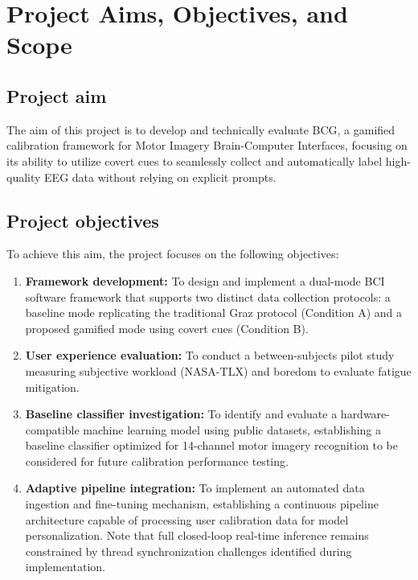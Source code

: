 \documentclass[a4paper, 11pt, openany]{report}
\begin{document}

\chapter{Project Aims, Objectives, and Scope}   

    \section{Project aim}    
    The aim of this project is to develop and technically evaluate BCG, a gamified calibration 
    framework for Motor Imagery Brain-Computer Interfaces, focusing on its ability to utilize 
    covert cues to seamlessly collect and automatically label high-quality EEG data without 
    relying on explicit prompts.

    \section{Project objectives}    
    To achieve this aim, the project focuses on the following objectives:
    
    \begin{enumerate}
        \item \textbf{Framework development:} To design and implement a dual-mode BCI software 
        framework that supports two distinct data collection protocols: a baseline mode 
        replicating the traditional Graz protocol (Condition A) and a proposed gamified 
        mode using covert cues (Condition B).
        
        \item \textbf{User experience evaluation:} To conduct a between-subjects pilot study 
        measuring subjective workload (NASA-TLX) and boredom to evaluate fatigue mitigation.
        
        \item \textbf{Baseline classifier investigation:} To identify and evaluate a hardware-compatible 
        machine learning model using public datasets, establishing a baseline classifier optimized for 
        14-channel motor imagery 
        recognition to be considered for future calibration performance testing.

        \item \textbf{Adaptive pipeline integration:} To implement an automated data ingestion and fine-tuning mechanism, 
        establishing a continuous pipeline architecture capable of processing user calibration data for model personalization. 
        Note that full closed-loop real-time inference remains constrained by thread synchronization challenges identified 
        during implementation.
    \end{enumerate}
        
\end{document}
